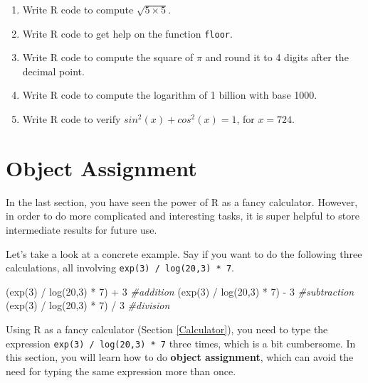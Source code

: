 \documentclass[
]{book}
\newenvironment{Shaded}{\begin{snugshade}}{\end{snugshade}}
\newcommand{\CommentTok}[1]{\textcolor[rgb]{0.56,0.35,0.01}{\textit{#1}}}
\newcommand{\DecValTok}[1]{\textcolor[rgb]{0.00,0.00,0.81}{#1}}
\newcommand{\FunctionTok}[1]{\textcolor[rgb]{0.00,0.00,0.00}{#1}}
\newcommand{\NormalTok}[1]{#1}
\newcommand{\SpecialCharTok}[1]{\textcolor[rgb]{0.00,0.00,0.00}{#1}}
\begin{document}
\begin{enumerate}
\def\labelenumi{\arabic{enumi}.}
\item
  Write R code to compute \(\sqrt{5 \times 5}\).
\item
  Write R code to get help on the function \texttt{floor}.
\item
  Write R code to compute the square of \(\pi\) and round it to 4 digits after the decimal point.
\item
  Write R code to compute the logarithm of 1 billion with base 1000.
\item
  Write R code to verify \(sin^2(x) + cos^2(x) = 1\), for \(x = 724\).
\end{enumerate}

\hypertarget{Object-Assignment}{%
\section{Object Assignment}\label{Object-Assignment}}

In the last section, you have seen the power of R as a fancy calculator. However, in order to do more complicated and interesting tasks, it is super helpful to store intermediate results for future use.

Let's take a look at a concrete example. Say if you want to do the following three calculations, all involving \texttt{exp(3)\ /\ log(20,3)\ *\ 7}.

\begin{Shaded}
\begin{Highlighting}[]
\NormalTok{(}\FunctionTok{exp}\NormalTok{(}\DecValTok{3}\NormalTok{) }\SpecialCharTok{/} \FunctionTok{log}\NormalTok{(}\DecValTok{20}\NormalTok{,}\DecValTok{3}\NormalTok{) }\SpecialCharTok{*} \DecValTok{7}\NormalTok{) }\SpecialCharTok{+} \DecValTok{3} \CommentTok{\#addition}
\NormalTok{(}\FunctionTok{exp}\NormalTok{(}\DecValTok{3}\NormalTok{) }\SpecialCharTok{/} \FunctionTok{log}\NormalTok{(}\DecValTok{20}\NormalTok{,}\DecValTok{3}\NormalTok{) }\SpecialCharTok{*} \DecValTok{7}\NormalTok{) }\SpecialCharTok{{-}} \DecValTok{3} \CommentTok{\#subtraction}
\NormalTok{(}\FunctionTok{exp}\NormalTok{(}\DecValTok{3}\NormalTok{) }\SpecialCharTok{/} \FunctionTok{log}\NormalTok{(}\DecValTok{20}\NormalTok{,}\DecValTok{3}\NormalTok{) }\SpecialCharTok{*} \DecValTok{7}\NormalTok{) }\SpecialCharTok{/} \DecValTok{3} \CommentTok{\#division}
\end{Highlighting}
\end{Shaded}

Using R as a fancy calculator (Section \ref{Calculator}), you need to type the expression \texttt{exp(3)\ /\ log(20,3)\ *\ 7} three times, which is a bit cumbersome. In this section, you will learn how to do \textbf{object assignment}, which can avoid the need for typing the same expression more than once.
\end{document}
